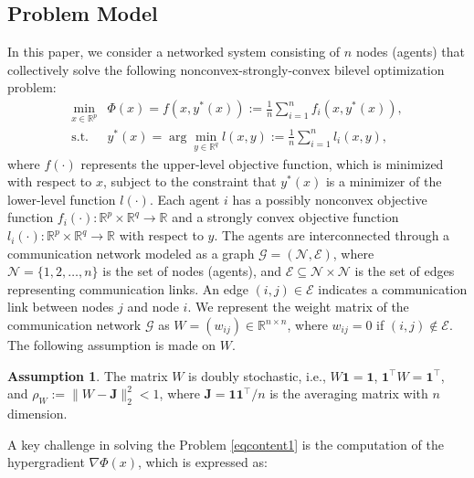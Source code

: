 \documentclass{article}
\theoremstyle{plain}
\theoremstyle{definition}
\newtheorem{assumption}[assumption]{Assumption}
\theoremstyle{remark}
\begin{document}
\subsection{Problem Model}
\vspace{-0.2cm}
In this paper, we consider a networked system consisting of $n$ nodes (agents) that collectively solve the following nonconvex-strongly-convex bilevel optimization problem:
\vspace{-0.23cm}
\begin{equation}\label{eqcontent1}
\begin{aligned}
    \min_{x \in \mathbb{R}^p} &\Phi(x) = f(x, y^*(x)) := \frac{1}{n} \sum_{i=1}^n f_i(x, y^*(x)), \\
    \text{s.t.} ~~& y^*(x) = \arg\min_{y \in \mathbb{R}^q} l(x, y) :=  \frac{1}{n} \sum_{i=1}^n l_i(x, y),
\end{aligned}
\end{equation}
where $f(\cdot)$ represents the upper-level objective function, which is minimized with respect to $x$, subject to the constraint that $y^*(x)$ is a minimizer of the lower-level function $l(\cdot)$. Each agent \(i\) has a possibly nonconvex objective function \(f_i(\cdot) : \mathbb{R}^p \times \mathbb{R}^q \to \mathbb{R}\) and a strongly convex objective function \(l_i(\cdot): \mathbb{R}^p \times \mathbb{R}^q \to \mathbb{R}\) with respect to $y$. The agents are interconnected through a communication network modeled as a graph \(\mathcal{G} = (\mathcal{N}, \mathcal{E})\), where \(\mathcal{N} = \{1, 2, \dots, n\}\) is the set of nodes (agents), and \(\mathcal{E} \subseteq \mathcal{N} \times \mathcal{N}\) is the set of edges representing communication links. An edge \((i, j) \in \mathcal{E}\) indicates a communication link between nodes \(j\) and node \(i\). We represent the weight matrix of the communication network $\mathcal{G}$ as $W = (w_{ij}) \in \mathbb{R}^{n \times n}$, where $w_{ij} = 0$ if \((i, j) \notin \mathcal{E}\). The following assumption is made on $W$. 
\begin{assumption}
The matrix $W$ is doubly stochastic, i.e., $W \mathbf{1}\! =\! \mathbf{1}$,  $\mathbf{1}^\top W \!=\! \mathbf{1}^\top$, and $\rho_W\!:= \|W\!-\!\mathbf{J}\|_2^2 \!< \!1$, where \( \mathbf{J} = \mathbf{1} \mathbf{1}^\top/n \) is the averaging matrix with $n$ dimension.\label{Assumption3}
\end{assumption}
\vspace{-0.2cm}
A key challenge in solving the Problem \eqref{eqcontent1} is the computation of the hypergradient $\nabla \Phi(x)$, which is expressed as:
\end{document}
